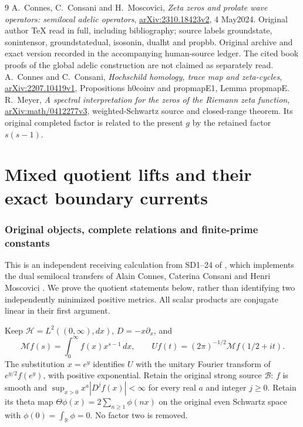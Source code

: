 \begin{thebibliography}{9}
 A.~Connes, C.~Consani and H.~Moscovici,
\emph{Zeta zeros and prolate wave operators: semilocal adelic operators},
\href{https://arxiv.org/abs/2310.18423v2}{arXiv:2310.18423v2},
4 May2024. Original author TeX read in full, including bibliography;
source labels groundstate, sonintensor, groundstatedual, isosonin,
dualht and propbb. Original archive and exact version recorded in
the accompanying human-source ledger. The cited book proofs of
the global adelic construction are not claimed as separately read.
 A.~Connes and C.~Consani,
\emph{Hochschild homology, trace map and zeta-cycles},
\href{https://arxiv.org/abs/2207.10419v1}{arXiv:2207.10419v1},
Propositions h0coinv and propmapE1, Lemma propmapE.
 R.~Meyer,
\emph{A spectral interpretation for the zeros of the Riemann zeta function},
\href{https://arxiv.org/abs/math/0412277v3}{arXiv:math/0412277v3},
weighted-Schwartz source and closed-range theorem. Its original
completed factor is related to the present $g$ by the retained
factor $s(s-1)$.
\end{thebibliography}

\endgroup

\clearpage\begingroup
\part*{Mixed quotient lifts and their exact boundary currents}
\newcommand{\swmixC}{\mathbb C}
\newcommand{\swmixHH}{\mathcal H}
\newcommand{\swmixDD}{\mathcal D}
\newcommand{\swmixTT}{\mathsf T}
\newcommand{\swmixEE}{\mathsf E}
\newcommand{\swmixim}{\operatorname{im}}
\newcommand{\swmixM}{\mathcal M}
\newcommand{\swmixB}{\mathscr B}


\section{Original objects, complete relations and finite-prime constants}
This is an independent receiving calculation from SD1--24 of
\cite{swmix:SD}, which implements the dual semilocal transfers of Alain
Connes, Caterina Consani and Henri Moscovici \cite{swmix:CCM}. We prove the
quotient statements below, rather than identifying two independently
minimized positive metrics. All scalar products are conjugate linear
in their first argument.

Keep $\swmixHH=L^2((0,\infty),dx)$, $D=-x\partial_x$, and
\[
 \swmixM f(s)=\int_0^\infty f(x)x^{s-1}\,dx,
 \qquad Uf(t)=(2\pi)^{-1/2}\swmixM f(1/2+it).                 \tag{MQ1}
\]
The substitution $x=e^y$ identifies $U$ with the unitary Fourier
transform of $e^{y/2}f(e^y)$, with positive exponential. Retain the
original strong source $\swmixB$: $f$ is smooth and
$\sup_{x>0}x^a|D^jf(x)|<\infty$ for every real $a$ and integer
$j\ge0$. Retain its theta map
$\Theta\phi(x)=2\sum_{n\ge1}\phi(nx)$ on the original even Schwartz
space with $\phi(0)=\int_{\mathbb R}\phi=0$. No factor two is removed.

